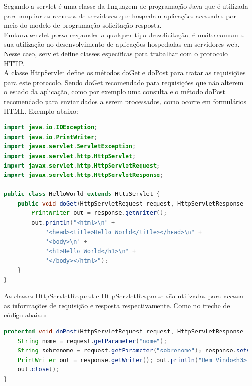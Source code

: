 Segundo a \cite{Oracle} servlet é uma classe da linguagem de programação Java que é utilizada para ampliar os recursos de servidores que hospedam aplicações acessadas por meio do modelo de programação solicitação-resposta. \\
\indent Embora servlet possa responder a qualquer tipo de solicitação, é muito comum a sua utilização no desenvolvimento de aplicações hospedadas em servidores web. Nesse caso, servlet define classes específicas para trabalhar com o protocolo HTTP. \\
\indent A classe HttpServlet define os métodos doGet e doPost para tratar as requisições para este protocolo. Sendo doGet recomendado para requisições que não alterem o estado da aplicação, como por exemplo uma consulta e o método doPost recomendado para enviar dados a serem processados, como ocorre em formulários HTML. Exemplo abaixo: \\

\begin{lstlisting}[language=Java,caption={Exemplo do método doGet}]
import java.io.IOException;
import java.io.PrintWriter;
import javax.servlet.ServletException;
import javax.servlet.http.HttpServlet;
import javax.servlet.http.HttpServletRequest;
import javax.servlet.http.HttpServletResponse;

public class HelloWorld extends HttpServlet {
	public void doGet(HttpServletRequest request, HttpServletResponse response) throws ServletException, IOException {
		PrintWriter out = response.getWriter();
		out.println("<html>\n" +
			"<head><title>Hello World</title></head>\n" +
			"<body>\n" +
			"<h1>Hello World</h1>\n" +
			"</body></html>");
	}
}
\end{lstlisting}

As classes HttpServletRequest e HttpServletResponse são utilizadas para acessar as informações de requisição e resposta respectivamente. Como no trecho de código abaixo: 

\begin{lstlisting}[language=Java,caption={Exemplo de uso HttpServletRequest}]
protected void doPost(HttpServletRequest request, HttpServletResponse response) throws ServletException, IOException { 
	String nome = request.getParameter("nome");
	String sobrenome = request.getParameter("sobrenome"); response.setContentType("text/html"); 
	PrintWriter out = response.getWriter(); out.println("Bem Vindo<h3>"+nome+" " +sobrenome+"</h3>"); 
	out.close(); 
}

\end{lstlisting}

